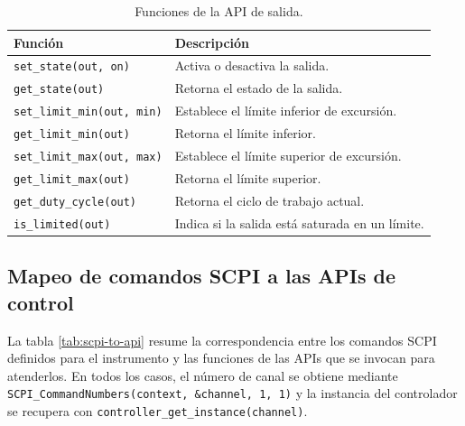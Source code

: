 \begin{table}[htbp]
    \centering
    \caption{Funciones de la API de salida.}
    \label{tab:output-api}
    \begin{tabular}{ll}
        \toprule
        \textbf{Función} & \textbf{Descripción} \\
        \midrule
        \texttt{set\_state(out, on)}       & Activa o desactiva la salida. \\
        \texttt{get\_state(out)}           & Retorna el estado de la salida. \\
        \texttt{set\_limit\_min(out, min)} & Establece el límite inferior de excursión. \\
        \texttt{get\_limit\_min(out)}      & Retorna el límite inferior. \\
        \texttt{set\_limit\_max(out, max)} & Establece el límite superior de excursión. \\
        \texttt{get\_limit\_max(out)}      & Retorna el límite superior. \\
        \texttt{get\_duty\_cycle(out)}     & Retorna el ciclo de trabajo actual. \\
        \texttt{is\_limited(out)}          & Indica si la salida está saturada en un límite. \\
        \bottomrule
    \end{tabular}
\end{table}

\subsection{Mapeo de comandos SCPI a las APIs de control}

La tabla \ref{tab:scpi-to-api} resume la correspondencia entre los comandos
SCPI definidos para el instrumento y las funciones de las APIs que se invocan
para atenderlos. En todos los casos, el número de canal se obtiene mediante
\texttt{SCPI\_CommandNumbers(context, \&channel, 1, 1)} y la instancia del
controlador se recupera con \texttt{controller\_get\_instance(channel)}.

